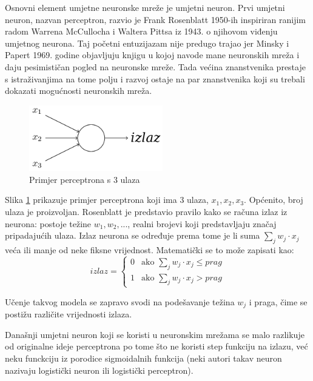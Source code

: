 \documentclass[times, utf8, diplomski, numeric]{fer}
\begin{document}
Osnovni element umjetne neuronske mreže je umjetni neuron. Prvi umjetni neuron, nazvan perceptron, razvio je Frank Rosenblatt 1950-ih inspiriran ranijim radom \cite{mcculloch43a}  Warrena  McCullocha i Waltera Pittsa iz 1943. o njihovom viđenju umjetnog neurona. Taj početni entuzijazam nije predugo trajao jer Minsky i Papert 1969. godine objavljuju knjigu \cite{minsky69perceptrons} u kojoj navode mane neuronskih mreža i daju pesimističan pogled na neuronske mreže. Tada većina znanstvenika prestaje s istraživanjima na tome polju i razvoj ostaje na par znanstvenika koji su trebali dokazati mogućnosti neuronskih mreža.

\begin{figure}[htb]
\centering
\includegraphics[width=220px]{imgs/percep.png}
\caption{Primjer perceptrona s 3 ulaza}
\label{fig:percep}
\end{figure}

Slika \ref{fig:percep} prikazuje primjer perceptrona koji ima 3 ulaza, $x_1, x_2, x_3$. Općenito, broj ulaza je proizvoljan. Rosenblatt je predstavio pravilo kako se računa izlaz iz neurona: postoje težine $w_1, w_2, ...$, realni brojevi koji predstavljaju značaj pripadajućih ulaza. Izlaz neurona se određuje prema tome je li suma $\sum_{j} w_j \cdot x_j$ veća ili manje od neke fiksne vrijednost. Matematički se to može zapisati kao:
\begin{equation}
izlaz =
\left\{
	\begin{array}{ll}
		0  & \mbox{ako } \sum_j w_j \cdot x_j \leq prag \\
		1  & \mbox{ako } \sum_j w_j \cdot x_j >  prag
	\end{array}
\right.
\end{equation}

Učenje takvog modela se zapravo svodi na podešavanje težina $w_j$ i praga, čime se postižu različite vrijednosti izlaza.

Današnji umjetni neuron koji se koristi u neuronskim mrežama se malo razlikuje od originalne ideje perceptrona po tome što ne koristi step funkciju na izlazu, već neku funckciju iz porodice sigmoidalnih funkcija (neki autori takav neuron nazivaju logistički neuron ili logistički perceptron).
\end{document}
